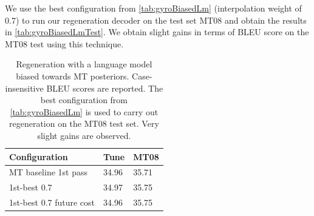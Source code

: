 We use the best configuration from \autoref{tab:gyroBiasedLm}
(interpolation weight of 0.7) to run
our regeneration decoder on the test set MT08 and obtain the results
in \autoref{tab:gyroBiasedLmTest}.
We obtain slight gains in terms of BLEU score on the MT08 test
using this technique. 
%
\begin{table}
  \begin{center}
    \begin{tabular}{l|l|l}
      Configuration & Tune & MT08 \\
      \hline
      MT baseline 1st pass & 34.96 & 35.71 \\
      \hline
      1st-best 0.7 & 34.97 & 35.75 \\
      1st-best 0.7 future cost & 34.96 & 35.75 \\
    \end{tabular}
    \caption{Regeneration with a language model biased towards MT
      posteriors. Case-insensitive BLEU scores are reported.
      The best configuration from \autoref{tab:gyroBiasedLm} is
      used to carry out regeneration on the MT08 test set. Very slight
      gains are observed.}
    \label{tab:gyroBiasedLmTest}
  \end{center}
\end{table}



